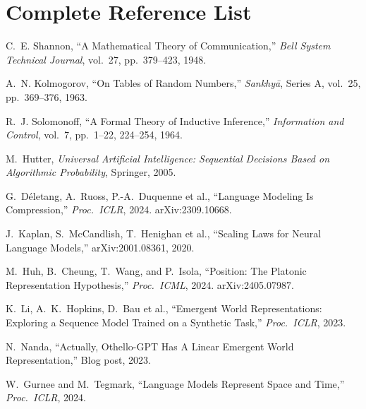 \documentclass[11pt, a4paper]{article}
\begin{document}
\section{Complete Reference List}

\begin{enumerate}[leftmargin=2em, label={[\arabic*]}]
  \item C.~E. Shannon, ``A Mathematical Theory of Communication,''
    \emph{Bell System Technical Journal}, vol.~27, pp.~379--423, 1948.

  \item A.~N. Kolmogorov, ``On Tables of Random Numbers,''
    \emph{Sankhy\=a}, Series A, vol.~25, pp.~369--376, 1963.

  \item R.~J. Solomonoff, ``A Formal Theory of Inductive Inference,''
    \emph{Information and Control}, vol.~7, pp.~1--22, 224--254, 1964.

  \item M.~Hutter, \emph{Universal Artificial Intelligence: Sequential
    Decisions Based on Algorithmic Probability}, Springer, 2005.

  \item G.~D\'{e}letang, A.~Ruoss, P.-A.~Duquenne et al., ``Language
    Modeling Is Compression,'' \emph{Proc.\ ICLR}, 2024.
    arXiv:2309.10668.

  \item J.~Kaplan, S.~McCandlish, T.~Henighan et al., ``Scaling Laws
    for Neural Language Models,'' arXiv:2001.08361, 2020.

  \item M.~Huh, B.~Cheung, T.~Wang, and P.~Isola, ``Position: The
    Platonic Representation Hypothesis,'' \emph{Proc.\ ICML}, 2024.
    arXiv:2405.07987.

  \item K.~Li, A.~K.~Hopkins, D.~Bau et al., ``Emergent World
    Representations: Exploring a Sequence Model Trained on a Synthetic
    Task,'' \emph{Proc.\ ICLR}, 2023.

  \item N.~Nanda, ``Actually, Othello-GPT Has A Linear Emergent World
    Representation,'' Blog post, 2023.

  \item W.~Gurnee and M.~Tegmark, ``Language Models Represent Space and
    Time,'' \emph{Proc.\ ICLR}, 2024.


\end{enumerate}
\end{document}
